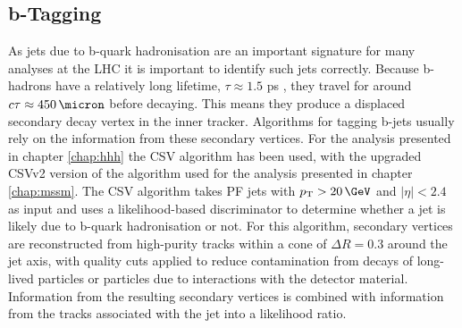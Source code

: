 \subsection{b-Tagging}
\label{sec:objects_jets_btag}
As jets due to b-quark hadronisation are an important signature
for many analyses at the \ac{LHC} it is important to identify such jets correctly.
Because b-hadrons have a relatively long lifetime, $\tau \approx 1.5$ ps \cite{pdg-2014},
they travel for around $c\tau \approx 450\,\micron$ before decaying. This means
they produce a displaced secondary decay vertex in the inner tracker.
Algorithms for tagging b-jets usually rely on the information
from these secondary vertices.
For the analysis presented in chapter \ref{chap:hhh}
the \ac{CSV} algorithm \cite{cms-btag-paper} has been used, with the upgraded
\ac{CSV}v2 version of the algorithm \cite{cms-btag-run2} used for the analysis presented in chapter \ref{chap:mssm}. 
The \ac{CSV} algorithm takes \ac{PF} jets with $\pTm> 20\,\GeV$ and $|\eta|<2.4$ as input and 
uses a likelihood-based discriminator to determine 
whether a jet is likely due to b-quark hadronisation or not.
For this algorithm, secondary vertices are reconstructed from high-purity tracks
within a cone of $\Delta R = 0.3$ around the jet axis, with quality cuts applied
to reduce contamination from decays of long-lived particles or particles due 
to interactions with the detector material. Information from the resulting
secondary vertices is combined with information from the tracks associated
with the jet into a likelihood ratio.


